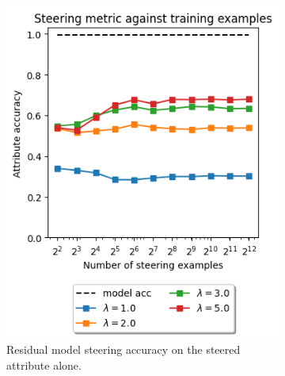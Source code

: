 \begin{figure}
\begin{subfigure}{0.45\textwidth}
        \includegraphics[width=\textwidth]{figures/residual-reproduction.png}
        \caption{Residual model steering accuracy on the steered attribute alone.}
        \label{fig:r-reproduction}
    \end{subfigure}
    \begin{subfigure}{0.45\textwidth}

\end{subfigure}
\end{figure}
